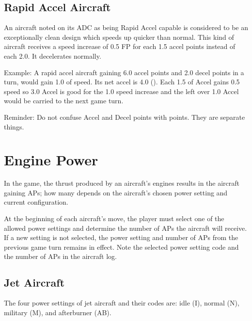 
\subsection{Rapid Accel Aircraft} An aircraft noted on its ADC as being Rapid Accel capable is considered to be an exceptionally clean design which speeds up quicker than normal. This kind of aircraft receives a speed increase of 0.5 FP for each 1.5 accel points instead of each 2.0. It decelerates normally.

Example: A rapid accel aircraft gaining 6.0 accel points and 2.0 decel points in a turn, would gain 1.0 of speed. Its net accel is 4.0 (). Each 1.5 of Accel gains 0.5 speed so 3.0 Accel is good for the 1.0 speed increase and the left over 1.0 Accel would be carried to the next game turn.

Reminder:  Do not confuse Accel and Decel points with  points. They are separate things.

\section{Engine Power}
\label{rule:engine-thrust}

In the game, the thrust produced by an aircraft's engines results in the aircraft gaining APs; how many depends on the aircraft's chosen power setting and current configuration.

At the beginning of each aircraft's move, the player must select one of the allowed power settings and determine the number of APs the aircraft will receive. If a new setting is not selected, the power setting and number of APs from the previous game turn remains in effect. Note the selected power setting code and the number of APs in the aircraft log.

\subsection{Jet Aircraft} The four power settings of jet aircraft and their codes are: idle (I), normal (N), military (M), and afterburner (AB).

